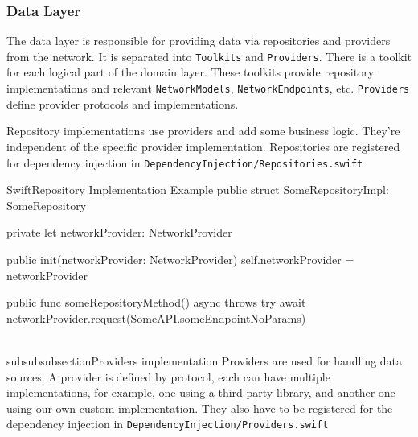 \documentclass[
  biblatex,
  language=english,
  figures=false,
  sourcecodes,
  glossaries,
  index
]{kidiplom}
\begin{document}
\subsubsection{Data Layer}
The data layer is responsible for providing data via repositories and providers from the network. It is separated into \texttt{Toolkits} and \texttt{Providers}. There is a toolkit for each logical part of the domain layer. These toolkits provide repository implementations and relevant \texttt{NetworkModels}, \texttt{NetworkEndpoints}, etc. \texttt{Providers} define provider protocols and implementations.

Repository implementations use providers and add some business logic. They're independent of the specific provider implementation. Repositories are registered for dependency injection in \texttt{DependencyInjection/Repositories.swift}

\begin{kicode}{Swift}{}{Repository Implementation Example}
public struct SomeRepositoryImpl: SomeRepository {
    
    private let networkProvider: NetworkProvider
    
    public init(networkProvider: NetworkProvider) {
        self.networkProvider = networkProvider
    }
    
    public func someRepositoryMethod() async throws {
        try await networkProvider.request(SomeAPI.someEndpointNoParams)
    }
}
\end{kicode}

\\subsubsubsection{Providers implementation}
Providers are used for handling data sources. A provider is defined by protocol, each can have multiple implementations, for example, one using a third-party library, and another one using our own custom implementation. They also have to be registered for the dependency injection in \texttt{DependencyInjection/Providers.swift}
\end{document}
